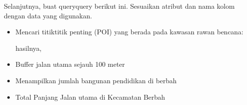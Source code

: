 \documentclass[letterpaper,10pt,english]{sphinxmanual}
\begin{document}
Selanjutnya, buat query\sphinxhyphen{}query berikut ini. Sesuaikan atribut dan nama kolom dengan data yang digunakan.
\begin{itemize}
\item {} 
Mencari titik\sphinxhyphen{}titik penting (POI) yang berada pada kawasan rawan bencana:

\begin{sphinxVerbatim}[commandchars=\\\{\}]
  
  
    
\end{sphinxVerbatim}

hasilnya,


\item {} 
Buffer jalan utama sejauh 100 meter

\begin{sphinxVerbatim}[commandchars=\\\{\}]
      
   
\end{sphinxVerbatim}

\item {} 
Menampilkan jumlah bangunan pendidikan di berbah

\begin{sphinxVerbatim}[commandchars=\\\{\}]
   
 
  
 
 
       
\end{sphinxVerbatim}

\item {} 
Total Panjang Jalan utama di Kecamatan Berbah


\end{itemize}
\end{document}
